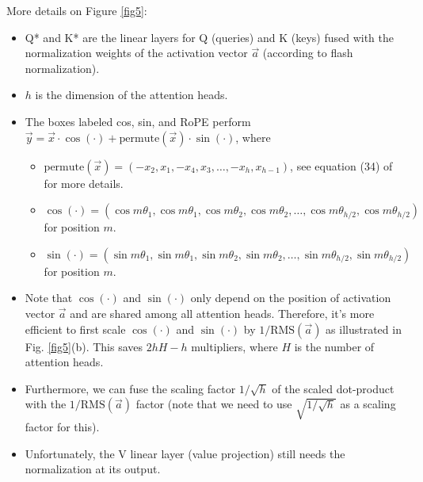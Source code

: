 \documentclass{article}
\numberwithin{equation}{section} %
\def\rms{\text{RMS}(\vec{a})}         %
\def\a{\vec{a}}                       %
\def\vx{\vec{x}}                      %
\def\vy{\vec{y}}                      %
\def\cosi{\cos{(\cdot)}}              %
\def\sini{\sin{(\cdot)}}              %
\begin{document}
More details on Figure \ref{fig5}:
\begin{itemize}[topsep=-1pt, itemsep=-1pt]
  \item Q* and K* are the linear layers for Q (queries) and K (keys) fused with the normalization weights of the activation vector $\a$ (according to flash normalization).
  \item $h$ is the dimension of the attention heads.
  \item The boxes labeled cos, sin, and RoPE perform $\vy = \vx \cdot \cosi + \text{permute}(\vx) \cdot \sini$, where
  \begin{itemize}[topsep=-1pt, itemsep=-1pt]
    \item $\text{permute}(\vx) = (-x_2, x_1, -x_4, x_3, \dots, -x_h, x_{h-1})$, see equation (34) of \citep{RoPE} for more details.
    \item $\cosi = (\cos m \theta_1, \cos m \theta_1, \cos m \theta_2, \cos m \theta_2, \dots, \cos m \theta_{h/2}, \cos m \theta_{h/2})$ for position $m$.
    \item $\sini = (\sin m \theta_1, \sin m \theta_1, \sin m \theta_2, \sin m \theta_2, \dots, \sin m \theta_{h/2}, \sin m \theta_{h/2})$ for position $m$.
  \end{itemize}
  \item Note that $\cosi$ and $\sini$ only depend on the position of activation vector $\a$ and are shared among all attention heads. Therefore, it’s more efficient to first scale $\cosi$ and $\sini$ by $1/ \rms$ as illustrated in Fig. \ref{fig5}(b). This saves $2hH - h$ multipliers, where $H$ is the number of attention heads.
  \item Furthermore, we can fuse the scaling factor $1/ \sqrt{h}$ of the scaled dot-product with the $1/ \rms$ factor (note that we need to use $\sqrt{1/ \sqrt{h}}$ as a scaling factor for this).
  \item Unfortunately, the V linear layer (value projection) still needs the normalization at its output.
\end{itemize}
\end{document}
